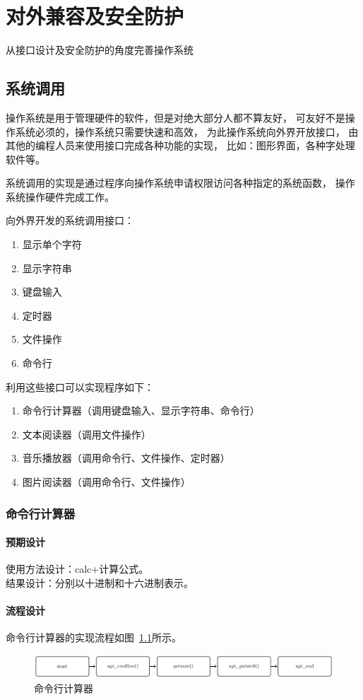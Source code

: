 \chapter{对外兼容及安全防护}

从接口设计及安全防护的角度完善操作系统

\section{系统调用}

操作系统是用于管理硬件的软件，但是对绝大部分人都不算友好，
可友好不是操作系统必须的，操作系统只需要快速和高效，
为此操作系统向外界开放接口，
由其他的编程人员来使用接口完成各种功能的实现，
比如：图形界面，各种字处理软件等。

系统调用的实现是通过程序向操作系统申请权限访问各种指定的系统函数，
操作系统操作硬件完成工作。

向外界开发的系统调用接口：
\begin{enumerate}
    \item 显示单个字符
    \item 显示字符串
    \item 键盘输入
    \item 定时器
    \item 文件操作
    \item 命令行
\end{enumerate}

利用这些接口可以实现程序如下：
\begin{enumerate}
    \item 命令行计算器（调用键盘输入、显示字符串、命令行）
    \item 文本阅读器（调用文件操作）
    \item 音乐播放器（调用命令行、文件操作、定时器）
    \item 图片阅读器（调用命令行、文件操作）
\end{enumerate}

\subsection{命令行计算器}

    \subsubsection{预期设计}
        使用方法设计：calc+计算公式。 \\
        结果设计：分别以十进制和十六进制表示。

    \subsubsection{流程设计}
    命令行计算器的实现流程如图~\ref{fig:calc}所示。
        \begin{figure}[H]
            \centering
            \includegraphics[width=\textwidth]{../Fig/api/calc.pdf}
            \caption{命令行计算器}
            \label{fig:calc}
        \end{figure}
        
